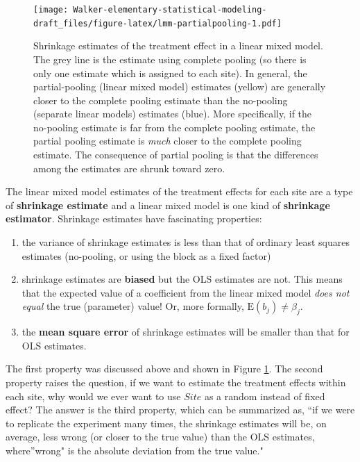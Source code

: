 \documentclass[]{book}
\providecommand{\tightlist}{%
  \setlength{\itemsep}{0pt}\setlength{\parskip}{0pt}}
\begin{document}
\begin{figure}
\centering
\texttt{[image: Walker-elementary-statistical-modeling-draft\_files/figure-latex/lmm-partialpooling-1.pdf]}
\caption{\label{fig:lmm-partialpooling}Shrinkage estimates of the treatment
effect in a linear mixed model. The grey line is the estimate using
complete pooling (so there is only one estimate which is assigned to
each site). In general, the partial-pooling (linear mixed model)
estimates (yellow) are generally closer to the complete pooling estimate
than the no-pooling (separate linear models) estimates (blue). More
specifically, if the no-pooling estimate is far from the complete
pooling estimate, the partial pooling estimate is \emph{much} closer to
the complete pooling estimate. The consequence of partial pooling is
that the differences among the estimates are shrunk toward zero.}
\end{figure}

The linear mixed model estimates of the treatment effects for each site
are a type of \textbf{shrinkage estimate} and a linear mixed model is
one kind of \textbf{shrinkage estimator}. Shrinkage estimates have
fascinating properties:

\begin{enumerate}
\def\labelenumi{\arabic{enumi}.}
\tightlist
\item
  the variance of shrinkage estimates is less than that of ordinary
  least squares estimates (no-pooling, or using the block as a fixed
  factor)
\item
  shrinkage estimates are \textbf{biased} but the OLS estimates are not.
  This means that the expected value of a coefficient from the linear
  mixed model \emph{does not equal} the true (parameter) value! Or, more
  formally, \(\mathrm{E}(b_j) \ne \beta_j\).
\item
  the \textbf{mean square error} of shrinkage estimates will be smaller
  than that for OLS estimates.
\end{enumerate}

The first property was discussed above and shown in Figure
\ref{fig:lmm-partialpooling}. The second property raises the question,
if we want to estimate the treatment effects within each site, why would
we ever want to use \(Site\) as a random instead of fixed effect? The
answer is the third property, which can be summarized as, ``if we were
to replicate the experiment many times, the shrinkage estimates will be,
on average, less wrong (or closer to the true value) than the OLS
estimates, where''wrong" is the absolute deviation from the true value."
\end{document}
